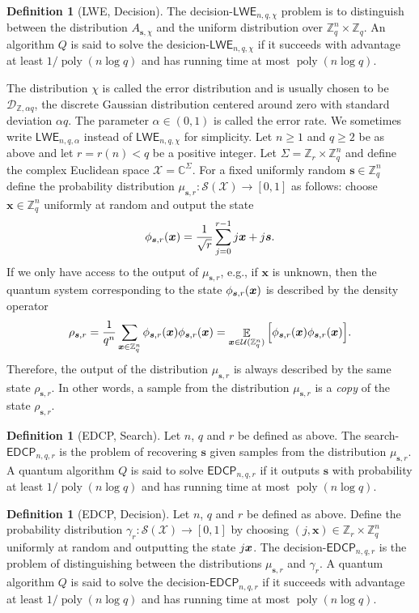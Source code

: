 \documentclass[11pt]{article}
\theoremstyle{plain}
\theoremstyle{definition}
\newtheorem{definition}[theorem]{Definition}
\DeclareMathOperator{\poly}{poly}
\DeclareMathOperator{\E}{\mathbb{E}}
\let\ket\relax
\DeclarePairedDelimiter{\ket}{\lvert}{\rangle}
\let\bra\relax
\DeclarePairedDelimiter{\bra}{\langle}{\rvert}
\def\C{\mathbb{C}}
\def\Z{\mathbb{Z}}
\def\lwe{\mathsf{LWE}}
\def\edcp{\mathsf{EDCP}}
\def\X{\mathcal{X}}
\def\SX{\mathcal{S(X)}}
\def\U{\mathcal{U}}
\begin{document}
\begin{definition}[LWE, Decision]
    The decision-$\lwe_{n, q, \chi}$ problem is to distinguish between the distribution $A_{\bm{s}, \chi}$ and the uniform distribution over $\Z_q^n \times \Z_q$. An algorithm $Q$ is said to solve the desicion-$\lwe_{n, q, \chi}$ if it succeeds with advantage at least $1 / \poly(n\log q)$ and has running time at most $\poly(n\log q)$. 
\end{definition}

The distribution $\chi$ is called the error distribution and is usually chosen to be $\mathcal{D}_{\Z, \alpha q}$, the discrete Gaussian distribution centered around zero with standard deviation $\alpha q$. The parameter $\alpha \in (0, 1)$ is called the error rate. We sometimes write $\lwe_{n, q, \alpha}$ instead of $\lwe_{n, q, \chi}$ for simplicity. Let $n \ge 1$ and $q \ge 2$ be as above and let $r = r(n) < q$ be a positive integer. Let $\Sigma = \Z_r \times \Z_q^n$ and define the complex Euclidean space $\X = \C^\Sigma$. For a fixed uniformly random $\bm{s} \in \Z_q^n$ define the probability distribution $\mu_{\bm{s}, r}: \SX \rightarrow [0, 1]$ as follows: choose $\bm{x} \in \Z_q^n$ uniformly at random and output the state
\[ \ket{\phi_{\bm{s}, r}(\bm{x})} = \frac{1}{\sqrt{r}} \sum_{j = 0}^{r - 1}\ket{j}\ket{\bm{x} + j\bm{s}}. \]
If we only have access to the output of $\mu_{\bm{s}, r}$, e.g., if $\bm{x}$ is unknown, then the quantum system corresponding to the state $\ket{\phi_{\bm{s}, r}(\bm{x})}$ is described by the density operator
\[ \rho_{\bm{s}, r} = \frac{1}{q^n} \sum_{\bm{x} \in \Z_q^n} \ket{\phi_{\bm{s}, r}(\bm{x})} \bra{\phi_{\bm{s}, r}(\bm{x})} = \E_{\bm{x} \in \U(\Z_q^n)} \Big[ \ket{\phi_{\bm{s}, r}(\bm{x})} \bra{\phi_{\bm{s}, r}(\bm{x})} \Big]. \]
Therefore, the output of the distribution $\mu_{\bm{s}, r}$ is always described by the same state $\rho_{\bm{s}, r}$. In other words, a sample from the distribution $\mu_{\bm{s}, r}$ is a \textit{copy} of the state $\rho_{\bm{s}, r}$.

\begin{definition}[EDCP, Search]
    Let $n$, $q$ and $r$ be defined as above. The search-$\edcp_{n, q, r}$ is the problem of recovering $\bm{s}$ given samples from the distribution $\mu_{\bm{s}, r}$. A quantum algorithm $Q$ is said to solve $\edcp_{n, q, r}$ if it outputs $\bm{s}$ with probability at least $1 / \poly(n\log q)$ and has running time at most $\poly(n\log q)$.
\end{definition}

\begin{definition}[EDCP, Decision]
    \label{def:d-edcp}
    Let $n$, $q$ and $r$ be defined as above. Define the probability distribution $\gamma_r: \SX \rightarrow [0, 1]$ by choosing $(j, \bm{x}) \in \Z_r \times \Z_q^n$ uniformly at random and outputting the state $\ket{j}\ket{\bm{x}}$. The decision-$\edcp_{n, q, r}$ is the problem of distinguishing between the distributions $\mu_{\bm{s}, r}$ and $\gamma_r$. A quantum algorithm $Q$ is said to solve the decision-$\edcp_{n, q, r}$ if it succeeds with advantage at least $1 / \poly(n\log q)$ and has running time at most $\poly(n\log q)$.
\end{definition}
\end{document}
